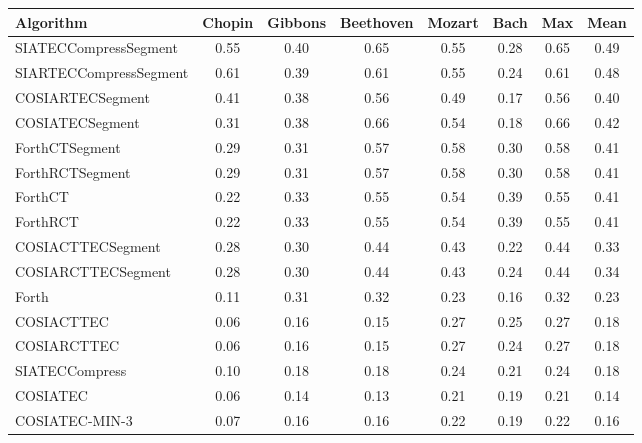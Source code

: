 \documentclass{article}
\begin{document}
\begin{table}
\centering
\begin{tabular}{lccccccc}\hline
Algorithm& Chopin&Gibbons& Beethoven& Mozart& Bach& Max& Mean\\\hline
SIATECCompressSegment&0.55&0.40&0.65&0.55&0.28&0.65&0.49\\
SIARTECCompressSegment&0.61&0.39&0.61&0.55&0.24&0.61&0.48\\
COSIARTECSegment&0.41&0.38&0.56&0.49&0.17&0.56&0.40\\
COSIATECSegment&0.31&0.38&0.66&0.54&0.18&0.66&0.42\\
ForthCTSegment&0.29&0.31&0.57&0.58&0.30&0.58&0.41\\
ForthRCTSegment&0.29&0.31&0.57&0.58&0.30&0.58&0.41\\
ForthCT&0.22&0.33&0.55&0.54&0.39&0.55&0.41\\
ForthRCT&0.22&0.33&0.55&0.54&0.39&0.55&0.41\\
COSIACTTECSegment&0.28&0.30&0.44&0.43&0.22&0.44&0.33\\
COSIARCTTECSegment&0.28&0.30&0.44&0.43&0.24&0.44&0.34\\
Forth&0.11&0.31&0.32&0.23&0.16&0.32&0.23\\
COSIACTTEC&0.06&0.16&0.15&0.27&0.25&0.27&0.18\\
COSIARCTTEC&0.06&0.16&0.15&0.27&0.24&0.27&0.18\\
SIATECCompress&0.10&0.18&0.18&0.24&0.21&0.24&0.18\\
COSIATEC&0.06&0.14&0.13&0.21&0.19&0.21&0.14\\
COSIATEC-MIN-3&0.07&0.16&0.16&0.22&0.19&0.22&0.16\\
\hline
\end{tabular}
\end{table}
\end{document}
